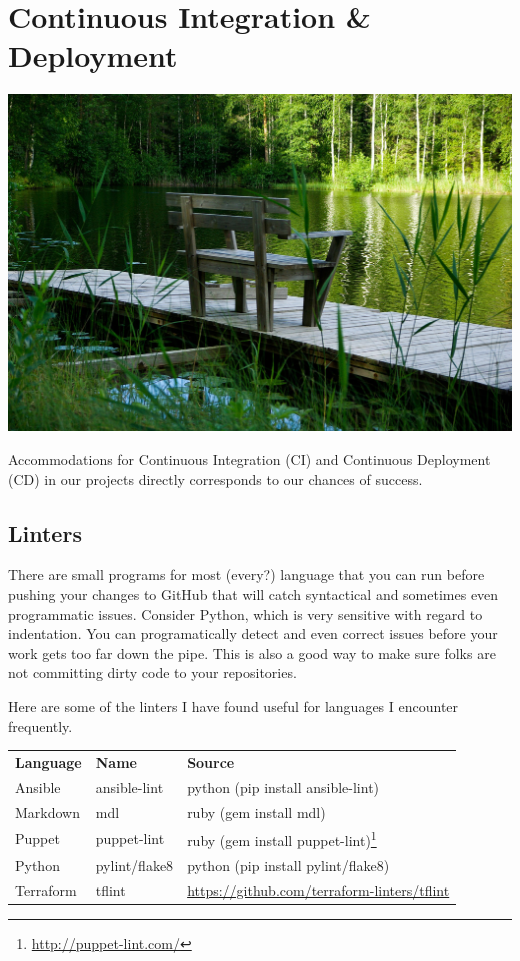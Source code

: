 \chapter{Continuous Integration \& Deployment}

\includegraphics[scale=0.85]{../images/finland-905712_1920.jpg}

\justify
Accommodations for Continuous Integration (CI) and Continuous Deployment (CD) in our projects directly corresponds to our chances of success.

\section{Linters}

\justify
There are small programs for most (every?) language that you can run before pushing your changes to GitHub that will catch syntactical and sometimes even programmatic issues. Consider Python, which is very sensitive with regard to indentation. You can programatically detect and even correct issues before your work gets too far down the pipe. This is also a good way to make sure folks are not committing dirty code to your repositories.

\justify
Here are some of the linters I have found useful for languages I encounter frequently.

\begin{table}[h]
\begin{center}
\begin{tabular}{| p{2.5cm}| p{2.5cm} | p{2.5cm} |}
	\hline
	\textbf{Language} & \textbf{Name} & \textbf{Source}\\
	Ansible & ansible-lint & python (pip install ansible-lint)\\
	Markdown & mdl & ruby (gem install mdl)\\
	Puppet & puppet-lint & ruby (gem install puppet-lint)\footnote{\url{http://puppet-lint.com/}}\\
	Python & pylint/flake8 & python (pip install pylint/flake8)\\
	Terraform & tflint & \url{https://github.com/terraform-linters/tflint}
\end{tabular}
\end{center}
\end{table}

